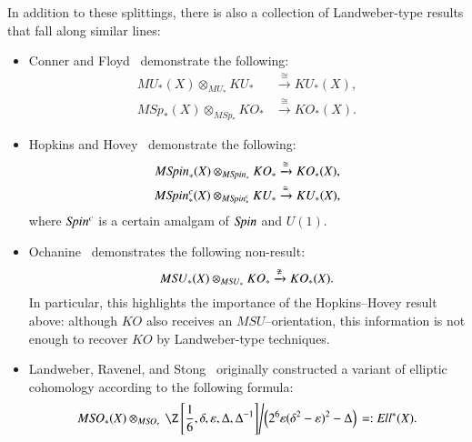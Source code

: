 In addition to these splittings, there is also a collection of Landweber-type results that fall along similar lines:
\begin{itemize}
    \item Conner and Floyd~\cite{ConnerFloyd} demonstrate the following:
    \begin{align*}
    MU_*(X) \otimes_{MU_*} KU_* & \xrightarrow\cong KU_*(X), \\
    M\mathit{Sp}_*(X) \otimes_{M\mathit{Sp}_*} KO_* & \xrightarrow\cong KO_*(X).
    \end{align*}
    \item Hopkins and Hovey~\cite[Theorem 1]{HopkinsHovey} demonstrate the following:
    \begin{align*}
    M\mathit{Spin}_*(X) \otimes_{M\mathit{Spin}_*} KO_* & \xrightarrow\cong KO_*(X), \\
    M\mathit{Spin}^c_*(X) \otimes_{M\mathit{Spin}^c_*} KU_* & \xrightarrow\cong KU_*(X),
    \end{align*}
    where $\mathit{Spin}^c$ is a certain amalgam of $\mathit{Spin}$ and $U(1)$.
    \item Ochanine~\cite{OchanineSUModules} demonstrates the following non-result: \[M\mathit{SU}_*(X) \otimes_{M\mathit{SU}_*} KO_* \xrightarrow{\not\cong} KO_*(X).\]  In particular, this highlights the importance of the Hopkins--Hovey result above: although $KO$ also receives an $MSU$--orientation, this information is not enough to recover $KO$ by Landweber-type techniques.
    \item Landweber, Ravenel, and Stong~\cite{LandweberEll,LRS} originally constructed a variant of elliptic cohomology according to the following formula:  \[M\SO_*(X) \otimes_{M\SO_*} \left.\Z\left[\frac{1}{6}, \delta, \eps, \Delta, \Delta^{-1}\right] \middle/ \left(2^6 \eps (\delta^2 - \eps)^2 - \Delta\right)\right. =: \mathit{Ell}^*(X).\]
\end{itemize}

